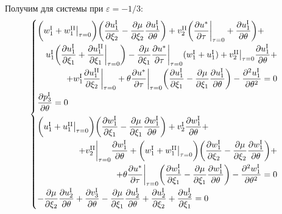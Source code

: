\documentclass[../master.tex]{subfiles}
\begin{document}
Получим для системы при $\varepsilon=-1/3$:
\begin{equation}
	\begin{cases}
		\bigg(w_1^{\text{I}} + w_1^{\text{II}}\big|_{\tau=0}\bigg) \bigg(\dfrac{\partial u_1^{\text{I}}}{\partial \xi_2}
		- \dfrac{\partial \mu}{\partial \xi_2}\dfrac{\partial u_1^{\text{I}}}{\partial \theta} \bigg) + v_2^{\text{II}} \bigg(
		\dfrac{\partial u^*}{\partial \tau}\bigg|_{\tau=0} + \dfrac{\partial u_1^{\text{I}}}{\partial \theta} \bigg)+
		\\[2ex] \quad \hfill  u_1^{\text{I}}\bigg(\dfrac{\partial u_1^{\text{I}}}{\partial \xi_1} + \dfrac{\partial u_1^{\text{II}}}{\partial \xi_1}\bigg|_{\tau=0} \bigg) - \dfrac{\partial \mu}{\partial \xi_1}\dfrac{\partial u^*}{\partial \tau}\bigg|_{\tau=0}(w_1^{\text{I}} + u_1^{\text{I}}) + v_2^{\text{II}}\big|_{\tau=0}\dfrac{\partial u_1^{\text{I}}}{\partial \theta} +  \\[2ex] \quad \hfill + w_1^{\text{I}}\dfrac{\partial u_1^{\text{II}}}{\partial \xi_2}\bigg|_{\tau=0} + \theta \dfrac{\partial u^*}{\partial \tau}\bigg|_{\tau=0}\bigg(\dfrac{\partial u_1^{\text{I}}}{\partial \xi_1} - \dfrac{\partial \mu}{\partial \xi_1}\dfrac{\partial u_1^{\text{I}}}{\partial \theta} \bigg) - \dfrac{\partial^2 u_1^{\text{I}}}{\partial \theta^2} = 0 \\[2ex]
		\dfrac{\partial p_3^{\text{I}}}{\partial \theta} = 0 \\[2ex]
		\bigg(u_1^{\text{I}} + u_1^{\text{II}}\big|_{\tau=0}\bigg)\bigg(\dfrac{\partial w_1^{\text{I}}}{\partial \xi_1}
		- \dfrac{\partial \mu}{\partial \xi_1}\dfrac{\partial w_1^{\text{I}}}{\partial \theta} \bigg) + v_2^{\text{I}} \dfrac{\partial w_1^{\text{I}}}{\partial \theta} + \\[2ex] \quad \hfill + v_2^{\text{II}}\bigg|_{\tau=0}\dfrac{\partial w_1^{\text{I}}}{\partial \theta} + \bigg(w_1^{\text{I}} + w_1^{\text{II}}\big|_{\tau=0}\bigg) \bigg(\dfrac{\partial w_1^{\text{I}}}{\partial \xi_2} - \dfrac{\partial \mu}{\partial \xi_2}\dfrac{\partial w_1^{\text{I}}}{\partial \theta} \bigg) + \\[2ex] \quad \hfill + \theta \dfrac{\partial u^*}{\partial \tau}\bigg|_{\tau=0} \bigg(\dfrac{\partial w_1^{\text{I}}}{\partial \xi_1}	- \dfrac{\partial \mu}{\partial \xi_1}\dfrac{\partial w_1^{\text{I}}}{\partial \theta} \bigg) - \dfrac{\partial^2 w_1^{\text{I}}}{\partial \theta^2} = 0 \\[2ex]
		-\dfrac{\partial \mu}{\partial \xi_2} \dfrac{\partial u_2^{\text{I}}}{\partial \theta} + 
			 \dfrac{\partial v_3^{\text{I}}}{\partial \theta} - 
			 \dfrac{\partial \mu}{\partial \xi_1} \dfrac{\partial u_2^{\text{I}}}{\partial \theta} + 
			 \dfrac{\partial u_2^{\text{I}}}{\partial \xi_2} + 
			 \dfrac{\partial u_2^{\text{I}}}{\partial \xi_1} = 0		
	\end{cases}
\end{equation}
\end{document}
